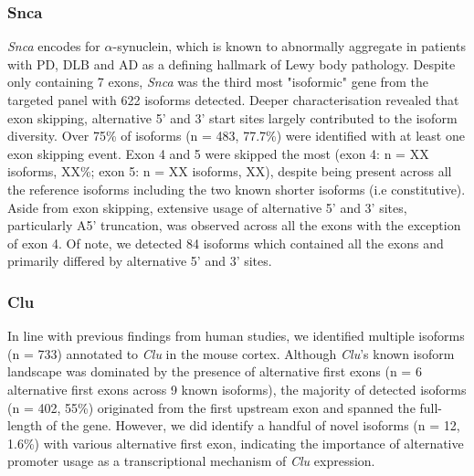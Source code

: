 \subsubsection{Snca}
\textit{Snca} encodes for $\alpha$-synuclein, which is known to abnormally aggregate in patients with PD, DLB and AD as a defining hallmark of Lewy body pathology. Despite only containing 7 exons, \textit{Snca} was the third most "isoformic" gene from the targeted panel with 622 isoforms detected. Deeper characterisation revealed that exon skipping, alternative 5' and 3' start sites largely contributed to the isoform diversity. Over 75\% of isoforms (n  = 483, 77.7\%) were identified with at least one exon skipping event. Exon 4 and 5 were skipped the most (exon 4: n = XX isoforms, XX\%; exon 5: n = XX isoforms, XX), despite being present across all the reference isoforms including the two known shorter isoforms (i.e constitutive). Aside from exon skipping, extensive usage of alternative 5' and 3' sites, particularly A5' truncation, was observed across all the exons with the exception of exon 4. Of note, we detected 84 isoforms which contained all the exons and primarily differed by alternative 5' and 3' sites. 

\subsubsection{Clu}
In line with previous findings from human studies, we identified multiple isoforms (n = 733) annotated to \textit{Clu} in the mouse cortex. Although \textit{Clu}'s known isoform landscape was dominated by the presence of alternative first exons (n = 6 alternative first exons across 9 known isoforms), the majority of detected isoforms (n = 402, 55\%) originated from the first upstream exon and spanned the full-length of the gene. However, we did identify a handful of novel isoforms (n = 12, 1.6\%) with various alternative first exon, indicating the importance of alternative promoter usage as a transcriptional mechanism of \textit{Clu} expression.

